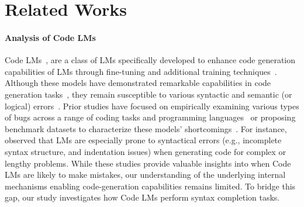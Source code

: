 \section{Related Works}

{\paragraph{Analysis of Code LMs} Code LMs~\cite{abdin2024phi, team2024codegemma, guo2024deepseek, li2023starcoder, roziere2023code, chen2021evaluating}, are a class of LMs specifically developed to enhance code generation capabilities of LMs through fine-tuning and additional training techniques~\cite{chan2023transformer}. Although these models have demonstrated remarkable capabilities in code generation tasks~\cite{yu2024codereval, zhuo2024bigcodebench, lai2023ds, cassano2023multipl, hao2022aixbench, srivastava2022beyond, hendrycks2021measuring}, they remain susceptible to various syntactic and semantic (or logical) errors~\cite{yu2024codereval, tambon2024bugs, dou2024s}. Prior studies have focused on empirically examining various types of bugs across a range of coding tasks and programming languages~\cite{dou2024s, tambon2024bugs, dakhel2023github} or proposing benchmark datasets to characterize these models' shortcomings~\cite{wang2023recode, siddiq2022securityeval, yang2024seccodeplt}. For instance, \citet{dou2024s} observed that LMs are especially prone to syntactical errors (e.g., incomplete syntax structure, and indentation issues) when generating code for complex or lengthy problems. While these studies provide valuable insights into when Code LMs are likely to make mistakes, our understanding of the underlying internal mechanisms enabling code-generation capabilities remains limited. To bridge this gap, our study investigates how Code LMs perform syntax completion tasks.}

